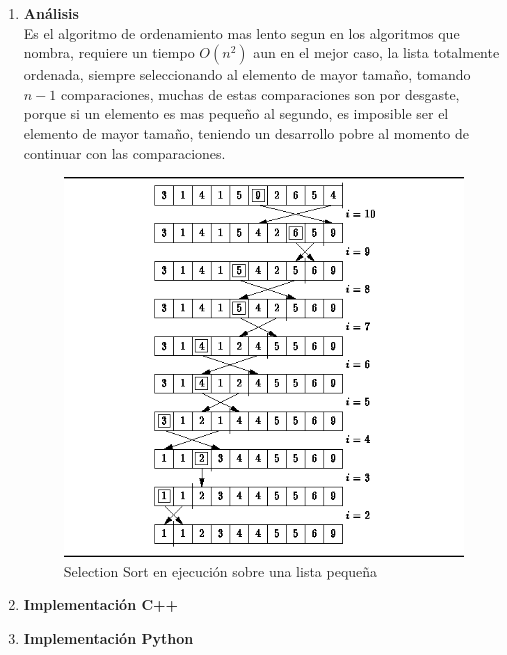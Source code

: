 \documentclass{article}
\begin{document}
		            \begin{enumerate}
                        \item \textbf{An\'{a}lisis}\\
                            Es el algoritmo de ordenamiento mas lento segun \cite{Heineman2008} en los algoritmos que nombra, requiere un tiempo $O(n^2)$ aun en el mejor caso, la lista totalmente ordenada, siempre seleccionando al elemento de mayor tamaño, tomando $n-1$ comparaciones, muchas de estas comparaciones son por desgaste, porque si un elemento es mas pequeño al segundo, es imposible ser el elemento de mayor tamaño, teniendo un desarrollo pobre al momento de continuar con las comparaciones.
                            
                            \begin{figure}[H]
                				\centering
                				\includegraphics[scale=0.60]{img/selection_sort_img1.png}
                				\caption{Selection Sort en ejecución sobre una lista pequeña}
                				\label{fig:selection_sort_img1}
                			\end{figure}
                            
                        \item \textbf{Implementaci\'{o}n C++}
                    
                            
                            
                            \item \textbf{Implementaci\'{o}n Python}\\
                    
                            
                    \end{enumerate}
		    
\end{document}
